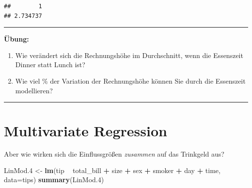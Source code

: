 \documentclass[12pt,ngerman,paper=a4,pagesize,DIV=13]{scrreprt}
\newenvironment{Shaded}{\begin{snugshade}}{\end{snugshade}}
\newcommand{\DataTypeTok}[1]{\textcolor[rgb]{0.13,0.29,0.53}{#1}}
\newcommand{\FloatTok}[1]{\textcolor[rgb]{0.00,0.00,0.81}{#1}}
\newcommand{\KeywordTok}[1]{\textcolor[rgb]{0.13,0.29,0.53}{\textbf{#1}}}
\newcommand{\NormalTok}[1]{#1}
\newcommand{\OperatorTok}[1]{\textcolor[rgb]{0.81,0.36,0.00}{\textbf{#1}}}
\newcommand{\StringTok}[1]{\textcolor[rgb]{0.31,0.60,0.02}{#1}}
\providecommand{\tightlist}{%
  \setlength{\itemsep}{0pt}\setlength{\parskip}{0pt}}
\begin{document}
\begin{verbatim}
##        1 
## 2.734737
\end{verbatim}

\begin{center}\rule{0.5\linewidth}{\linethickness}\end{center}

\textbf{Übung:}

\begin{enumerate}
\def\labelenumi{\arabic{enumi}.}
\setcounter{enumi}{2}
\tightlist
\item
  Wie verändert sich die Rechnungshöhe im Durchschnitt, wenn die
  Essenszeit Dinner statt Lunch ist?
\item
  Wie viel \% der Variation der Rechnungshöhe können Sie durch die
  Essenszeit modellieren?
\end{enumerate}

\begin{center}\rule{0.5\linewidth}{\linethickness}\end{center}

\hypertarget{multivariate-regression}{%
\section{Multivariate Regression}\label{multivariate-regression}}

Aber wie wirken sich die Einflussgrößen \emph{zusammen} auf das
Trinkgeld aus?

\begin{Shaded}
\begin{Highlighting}[]
\NormalTok{LinMod}\FloatTok{.4}\NormalTok{ <-}\StringTok{ }\KeywordTok{lm}\NormalTok{(tip }\OperatorTok{~}\StringTok{ }\NormalTok{total_bill }\OperatorTok{+}\StringTok{ }\NormalTok{size }\OperatorTok{+}\StringTok{ }\NormalTok{sex  }\OperatorTok{+}\StringTok{ }\NormalTok{smoker }\OperatorTok{+}\StringTok{ }\NormalTok{day }\OperatorTok{+}\StringTok{ }\NormalTok{time, }\DataTypeTok{data=}\NormalTok{tips)}
\KeywordTok{summary}\NormalTok{(LinMod}\FloatTok{.4}\NormalTok{)}
\end{Highlighting}
\end{Shaded}
\end{document}
